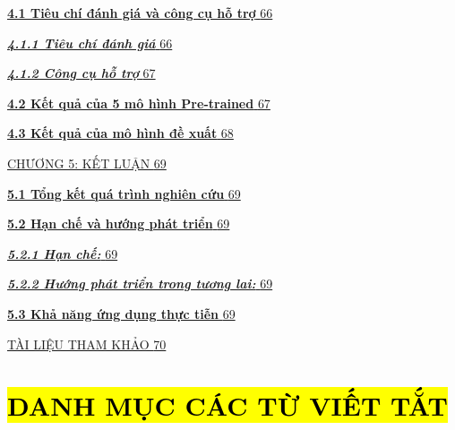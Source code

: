 \documentclass[
]{article}
\begin{document}
\hyperref[_Toc232112035]{\textbf{4.1 Tiêu chí đánh giá và công cụ hỗ
trợ} \hyperref[_Toc232112035]{66}}

\hyperref[_Toc232112036]{\emph{\textbf{4.1.1 Tiêu chí đánh giá}}
\hyperref[_Toc232112036]{66}}

\hyperref[_Toc232112037]{\emph{\textbf{4.1.2 Công cụ hỗ trợ}}
\hyperref[_Toc232112037]{67}}

\hyperref[_Toc232112038]{\textbf{4.2 Kết quả của 5 mô hình Pre-trained}
\hyperref[_Toc232112038]{67}}

\hyperref[_Toc232112039]{\textbf{4.3 Kết quả của mô hình đề xuất}
\hyperref[_Toc232112039]{68}}

\hyperref[chux1b0ux1a1ng-5-kux1ebft-luux1eadn]{CHƯƠNG 5: KẾT LUẬN
\hyperref[chux1b0ux1a1ng-5-kux1ebft-luux1eadn]{69}}

\hyperref[_Toc232112041]{\textbf{5.1 Tổng kết quá trình nghiên cứu}
\hyperref[_Toc232112041]{69}}

\hyperref[_Toc232112042]{\textbf{5.2 Hạn chế và hướng phát triển}
\hyperref[_Toc232112042]{69}}

\hyperref[_Toc232112043]{\emph{\textbf{5.2.1 Hạn chế:}}
\hyperref[_Toc232112043]{69}}

\hyperref[_Toc232112044]{\emph{\textbf{5.2.2 Hướng phát triển trong
tương lai:}} \hyperref[_Toc232112044]{69}}

\hyperref[_Toc232112045]{\textbf{5.3 Khả năng ứng dụng thực tiễn}
\hyperref[_Toc232112045]{69}}

\hyperref[tuxe0i-liux1ec7u-tham-khux1ea3o]{TÀI LIỆU THAM KHẢO
\hyperref[tuxe0i-liux1ec7u-tham-khux1ea3o]{70}}

\section{\texorpdfstring{\hl{DANH MỤC CÁC TỪ VIẾT
TẮT}}{DANH MỤC CÁC TỪ VIẾT TẮT}}\label{danh-mux1ee5c-cuxe1c-tux1eeb-viux1ebft-tux1eaft}
\end{document}

